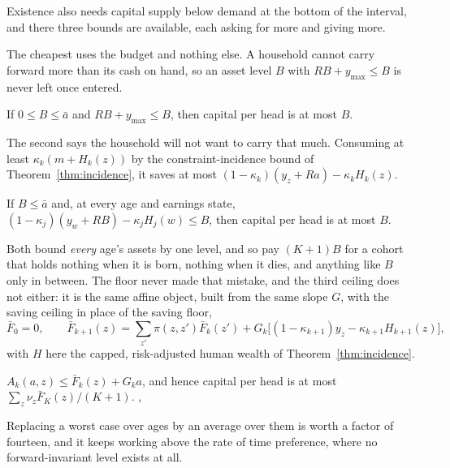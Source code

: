 Existence also needs capital supply below demand at the bottom of the interval, and there three
bounds are available, each asking for more and giving more.

The cheapest uses the budget and nothing else. A household cannot carry forward more than its cash
on hand, so an asset level $B$ with $RB+y_{\max}\le B$ is never left once entered.

\begin{proposition}\label{prop:ceiling}
If $0\le B\le\bar a$ and $RB+y_{\max}\le B$, then capital per head is at most $B$.
\end{proposition}

The second says the household will not want to carry that much. Consuming at least
$\kappa_k(m+H_k(z))$ by the constraint-incidence bound of Theorem~\ref{thm:incidence}, it saves at
most $(1-\kappa_k)(y_z+Ra)-\kappa_kH_k(z)$.

\begin{proposition}\label{prop:ceiling2}
If $B\le\bar a$ and, at every age and earnings state,
$(1-\kappa_j)(y_w+RB)-\kappa_jH_j(w)\le B$, then capital per head is at most $B$.
\end{proposition}

Both bound \emph{every} age's assets by one level, and so pay $(K+1)B$ for a cohort that holds
nothing when it is born, nothing when it dies, and anything like $B$ only in between. The floor
never made that mistake, and the third ceiling does not either: it is the same affine object,
built from the same slope $G$, with the saving ceiling in place of the saving floor,
\[
  \bar F_0=0,\qquad
  \bar F_{k+1}(z)=\textstyle\sum_{z'}\pi(z,z')\bar F_k(z')
    +G_k\bigl[(1-\kappa_{k+1})y_z-\kappa_{k+1}H_{k+1}(z)\bigr],
\]
with $H$ here the capped, risk-adjusted human wealth of Theorem~\ref{thm:incidence}.

\begin{proposition}\label{prop:affceil}
$A_k(a,z)\le\bar F_k(z)+G_ka$, and hence capital per head is at most
$\sum_z\nu_z\bar F_K(z)/(K+1)$.
,
\end{proposition}

Replacing a worst case over ages by an average over them is worth a factor of fourteen, and it
keeps working above the rate of time preference, where no forward-invariant level exists at all.

